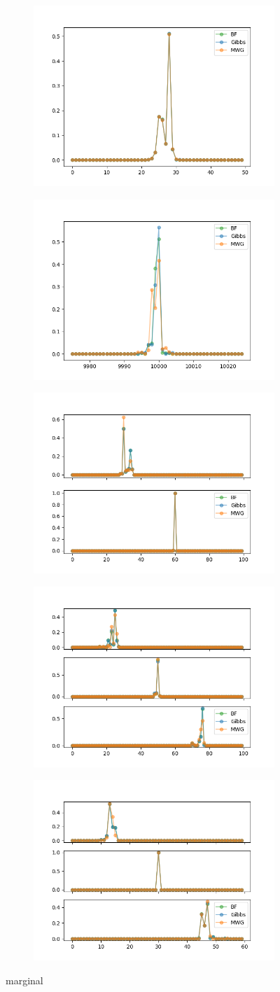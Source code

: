 \begin{figure}[h]
    \centering
    \begin{subfigure}
    	\centering
        \includegraphics[width=0.3\linewidth]{../../plots/Posterior_post_burnin_M2_N50_NMCMC1_seed3_diffind2.png}
    \end{subfigure}
    \begin{subfigure}
        \centering
    	\includegraphics[width=0.3\linewidth]{../../plots/Posterior_post_burnin_M2_N20000_NMCMC3_seed3_diffind2.png}
	\end{subfigure}
	\begin{subfigure}
	    \centering
    	\includegraphics[width=0.3\linewidth]{../../plots/Posterior_post_burnin_M3_N100_NMCMC3_seed3_diffind2.png}
	\end{subfigure}
	\begin{subfigure}
	    \centering
    	\includegraphics[width=0.3\linewidth]{../../plots/Posterior_post_burnin_M4_N100_NMCMC3_seed3_diffind2.png}
	\end{subfigure}
	\begin{subfigure}
	    \centering
    	\includegraphics[width=0.3\linewidth]{../../plots/Posterior_post_burnin_M4_N60_NMCMC3_seed3_diffind2.png}
	\end{subfigure}
	\caption{marginal}
\end{figure}
